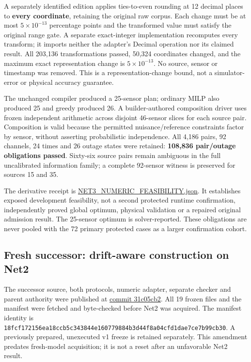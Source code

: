 \documentclass[
  11pt,
]{article}
\begin{document}
A separately identified edition applies ties-to-even rounding at 12
decimal places to \textbf{every coordinate}, retaining the original raw
corpus. Each change must be at most \(5\times10^{-13}\) percentage
points and the transformed value must satisfy the original range gate. A
separate exact-integer implementation recomputes every transform; it
imports neither the adapter's Decimal operation nor its claimed result.
All 203,136 transformations passed, 50,324 coordinates changed, and the
maximum exact representation change is \(5\times10^{-13}\). No source,
sensor or timestamp was removed. This is a representation-change bound,
not a simulator-error or physical accuracy guarantee.

The unchanged compiler produced a 25-sensor plan; ordinary MILP also
produced 25 and greedy produced 26. A builder-authored composition
driver uses frozen independent arithmetic across disjoint 46-sensor
slices for each source pair. Composition is valid because the permitted
nuisance/reference constraints factor by sensor, without asserting
probabilistic independence. All 4,186 pairs, 92 channels, 24 times and
26 outage states were retained: \textbf{108,836 pair/outage obligations
passed}. Sixty-six source pairs remain ambiguous in the full
uncalibrated information family; a complete 92-sensor witness is
preserved for sources 15 and 35.

The derivative receipt is
\href{https://github.com/MontrealAI/AGI-Alpha-Invention-Flywheel-Lab/blob/b0d828309f14ef4dc278dc522739df85db43c460/evidence/next009/numeric-edition/verification-v1/artifacts/NET3_NUMERIC_FEASIBILITY.json}{NET3\_NUMERIC\_FEASIBILITY.json}.
It establishes exposed development feasibility, not a second protected
runtime confirmation, independently proved global optimum, physical
validation or a repaired original admission result. The 25-sensor
optimum is solver-reported. These obligations are never pooled with the
72 primary protected cases as a larger confirmation cohort.

\hypertarget{fresh-successor-drift-aware-construction-on-net2}{%
\subsection{Fresh successor: drift-aware construction on
Net2}\label{fresh-successor-drift-aware-construction-on-net2}}

The successor source, both protocols, numeric adapter, separate checker
and parent authority were published at
\href{https://github.com/MontrealAI/AGI-Alpha-Invention-Flywheel-Lab/commit/31c05cb2f698f7e5b9159774482e8a9e5278beac}{commit
31c05cb2}. All 19 frozen files and the manifest were fetched and
byte-checked before Net2 was acquired. The manifest identity is
\nolinkurl{18fcf172156ea18ccb5c343844e160779884b3d44f8a04cfd1dae7ce7b99cb30}.
A previously prepared, unexecuted v1 freeze is retained separately. This
amendment predates fresh-model acquisition; it is not a reset after an
unfavorable Net2 result.
\end{document}
